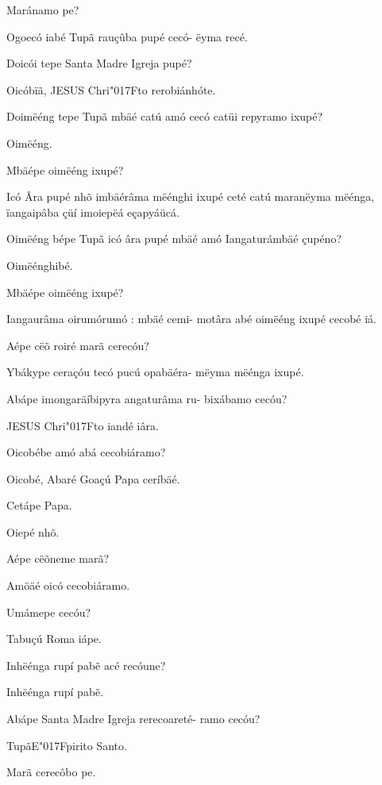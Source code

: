 \documentclass[openany,titlepage,12pt]{book}
\newcommand{\lgS}{\char"017F}
\begin{document}
\begin{alternate}
    \item Maránamo pe?
    \item Ogoecó iabé Tupã rauçûba pupé cecó-
    ëyma recé.
    \item Doicói tepe Santa Madre Igreja pupé?
    \pagebreak
    \item Oicóbïã, JESUS Chri\lgS to rerobiánhóte.
    \item Doimëéng tepe Tupã mbäé catú amó\linebreak
    cecó catüi repyramo ixupé?
    \item Oimëéng.
    \item Mbäépe oimëéng ixupé?
    \item Icó Âra pupé nhõ imbäérâma mëénghi
    ixupé ceté catú maranëyma mëénga,\linebreak
    ïangaipâba çüí imoiepëá eçapyáücá.
    \item Oimëéng bépe Tupã icó âra pupé mbäé
    amó Iangaturámbäé çupéno?
    \item Oimëénghibé.
    \item Mbäépe oimëéng ixupé?
    \item Iangaurâma oirumórumó : mbäé cemi-
    motâra abé oimëéng ixupé cecobé iá.
    \item Aépe cëõ roiré marã cerecóu?
    \item Ybákype ceraçóu tecó pucú opabäéra-\linebreak
    mëyma mëénga ixupé.
    \item Abápe imongaräíbipyra angaturâma ru-
    bixábamo cecóu?
    \item JESUS Chri\lgS to iandé iâra.
    \item Oicobébe amó abá cecobiáramo?
    \item Oicobé, Abaré Goaçú Papa ceríbäé.
    \item Cetápe Papa.
    \item Oiepé nhõ.
    \item Aépe cëõneme marã?
    \item Amöäé oicó cecobiáramo.
    \item Umámepe cecóu?\pagebreak
    \item Tabuçú Roma iápe.
    \item Inhëénga rupí pab\~e acé recóune?
    \item Inhëénga rupí pab\~e.
    \item Abápe Santa Madre Igreja rerecoareté-
    ramo cecóu?
    \item TupãE\lgS pirito Santo.
    \item Marã cerecôbo pe.

\end{alternate}
\end{document}
